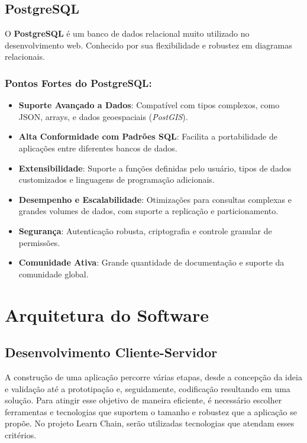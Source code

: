 \subsection{PostgreSQL}

O \textbf{PostgreSQL} é um banco de dados relacional muito utilizado no desenvolvimento web. Conhecido por sua flexibilidade e robustez em diagramas relacionais. 

\subsubsection*{Pontos Fortes do PostgreSQL:}
\begin{itemize}
    \item \textbf{Suporte Avançado a Dados}: Compatível com tipos complexos, como JSON, arrays, e dados geoespaciais (\textit{PostGIS}).
    \item \textbf{Alta Conformidade com Padrões SQL}: Facilita a portabilidade de aplicações entre diferentes bancos de dados.
    \item \textbf{Extensibilidade}: Suporte a funções definidas pelo usuário, tipos de dados customizados e linguagens de programação adicionais.
    \item \textbf{Desempenho e Escalabilidade}: Otimizações para consultas complexas e grandes volumes de dados, com suporte a replicação e particionamento.
    \item \textbf{Segurança}: Autenticação robusta, criptografia e controle granular de permissões.
    \item \textbf{Comunidade Ativa}: Grande quantidade de documentação e suporte da comunidade global.
\end{itemize}

\section{Arquitetura do Software}

\subsection{Desenvolvimento Cliente-Servidor}

A construção de uma aplicação percorre várias etapas, desde a concepção da ideia e validação até a prototipação e, seguidamente, codificação resultando em uma solução. Para atingir esse objetivo de maneira eficiente, é necessário escolher ferramentas e tecnologias que suportem  o tamanho e robustez que a aplicação se propõe. No projeto Learn Chain, serão utilizadas tecnologias que atendam esses critérios.

